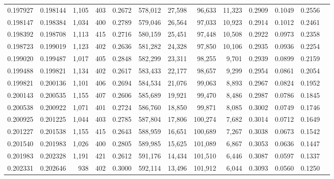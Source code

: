 \begin{tabular}{rrrrrrrrrrrrr}
0.197927 & 0.198144 & 1,105 & 403 &                                     0.2672 & 578,012 &  27,598 &  96,633 &  11,323 & 0.2909 & 0.1049 & 0.2556 \\
0.198147 & 0.198384 & 1,034 & 400 &                                     0.2789 & 579,046 &  26,564 &  97,033 &  10,923 & 0.2914 & 0.1012 & 0.2461 \\
0.198392 & 0.198708 & 1,113 & 415 &                                     0.2716 & 580,159 &  25,451 &  97,448 &  10,508 & 0.2922 & 0.0973 & 0.2358 \\
0.198723 & 0.199019 & 1,123 & 402 &                                     0.2636 & 581,282 &  24,328 &  97,850 &  10,106 & 0.2935 & 0.0936 & 0.2254 \\
0.199020 & 0.199487 & 1,017 & 405 &                                     0.2848 & 582,299 &  23,311 &  98,255 &   9,701 & 0.2939 & 0.0899 & 0.2159 \\
0.199488 & 0.199821 & 1,134 & 402 &                                     0.2617 & 583,433 &  22,177 &  98,657 &   9,299 & 0.2954 & 0.0861 & 0.2054 \\
0.199821 & 0.200136 & 1,101 & 406 &                                     0.2694 & 584,534 &  21,076 &  99,063 &   8,893 & 0.2967 & 0.0824 & 0.1952 \\
0.200143 & 0.200535 & 1,155 & 407 &                                     0.2606 & 585,689 &  19,921 &  99,470 &   8,486 & 0.2987 & 0.0786 & 0.1845 \\
0.200538 & 0.200922 & 1,071 & 401 &                                     0.2724 & 586,760 &  18,850 &  99,871 &   8,085 & 0.3002 & 0.0749 & 0.1746 \\
0.200925 & 0.201225 & 1,044 & 403 &                                     0.2785 & 587,804 &  17,806 & 100,274 &   7,682 & 0.3014 & 0.0712 & 0.1649 \\
0.201227 & 0.201538 & 1,155 & 415 &                                     0.2643 & 588,959 &  16,651 & 100,689 &   7,267 & 0.3038 & 0.0673 & 0.1542 \\
0.201540 & 0.201983 & 1,026 & 400 &                                     0.2805 & 589,985 &  15,625 & 101,089 &   6,867 & 0.3053 & 0.0636 & 0.1447 \\
0.201983 & 0.202328 & 1,191 & 421 &                                     0.2612 & 591,176 &  14,434 & 101,510 &   6,446 & 0.3087 & 0.0597 & 0.1337 \\
0.202331 & 0.202646 &   938 & 402 &                                     0.3000 & 592,114 &  13,496 & 101,912 &   6,044 & 0.3093 & 0.0560 & 0.1250 \\

\end{tabular}
